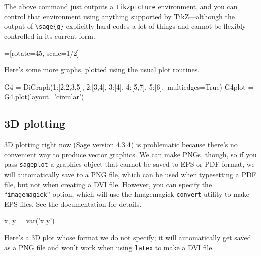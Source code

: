 \documentclass{article}
\begin{document}
\begin{center}
\end{center}

The above command just outputs a \texttt{tikzpicture} environment, and
you can control that environment using anything supported by
TikZ---although the output of \verb|\sage{g}| explicitly hard-codes a
lot of things and cannot be flexibly controlled in its current form.

=[rotate=45, scale=1/2]

\begin{center}
\end{center}

Here's some more graphs, plotted using the usual plot routines.


\begin{sageblock}
G4 = DiGraph({1:[2,2,3,5], 2:[3,4], 3:[4], 4:[5,7], 5:[6]},\
             multiedges=True)
G4plot = G4.plot(layout='circular')
\end{sageblock}


\subsection{3D plotting}

3D plotting right now (Sage version 4.3.4) is problematic because
there's no convenient way to produce vector graphics. We can make PNGs,
though, so if you pass \verb|sageplot| a graphics object that cannot be
saved to EPS or PDF format, we will automatically save to a PNG file,
which can be used when typesetting a PDF file, but not when creating a
DVI file. However, you can specify the ``\texttt{imagemagick}'' option,
which will use the Imagemagick \texttt{convert} utility to make EPS
files. See the documentation for details.


\begin{sagesilent}
  x, y = var('x y')
\end{sagesilent}

Here's a 3D plot whose format we do not specify; it will automatically
get saved as a PNG file and won't work when using \texttt{latex} to make
a DVI file.

\end{document}
